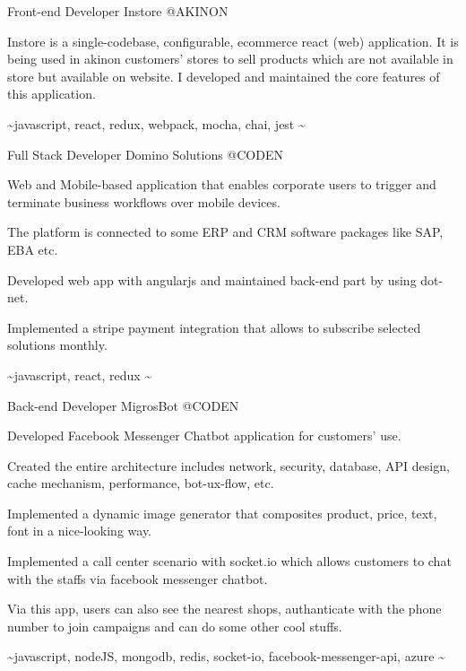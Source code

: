 \begin{cventries}
  \cventry
    {Front-end Developer} %
    {Instore} %
    {@AKINON} %
    {}
    {
      \begin{cvitems} %
        \item {Instore is a single-codebase, configurable, ecommerce react (web) application. It is being used in akinon customers' stores to sell products which are not available in store but available on website. I developed and maintained the core features of this application.}
        \item {\textasciitilde javascript, react, redux, webpack, mocha, chai, jest \textasciitilde}
      \end{cvitems}
    }

  \cventry
    {Full Stack Developer} %
    {Domino Solutions} %
    {@CODEN} %
    {}
    {
      \begin{cvitems} %
        \item {Web and Mobile-based application that enables corporate users to trigger and terminate business workflows over mobile devices.}
        \item {The platform is connected to some ERP and CRM software packages like SAP, EBA etc.}
        \item {Developed web app with angularjs and maintained back-end part by using dot-net.}
        \item {Implemented a stripe payment integration that allows to subscribe selected solutions monthly.}
        \item {\textasciitilde javascript, react, redux \textasciitilde}
      \end{cvitems}
    }

  \cventry
    {Back-end Developer} %
    {MigrosBot} %
    {@CODEN} %
    {}
    {
      \begin{cvitems} %
        \item {Developed Facebook Messenger Chatbot application for customers' use.}
        \item {Created the entire architecture includes network, security, database, API design, cache mechanism, performance, bot-ux-flow, etc.}
        \item {Implemented a dynamic image generator that composites product, price, text, font in a nice-looking way.}
        \item {Implemented a call center scenario with socket.io which allows customers to chat with the staffs via facebook messenger chatbot.}
        \item {Via this app, users can also see the nearest shops, authanticate with the phone number to join campaigns and can do some other cool stuffs.}
        \item {\textasciitilde javascript, nodeJS, mongodb, redis, socket-io, facebook-messenger-api, azure \textasciitilde}
      \end{cvitems}
    }


\end{cventries}
